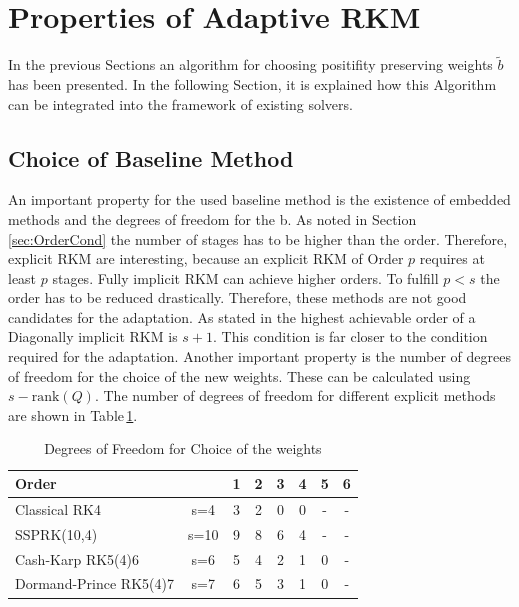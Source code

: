 \documentclass[a4paper]{article}
\numberwithin{equation}{section}
\theoremstyle{plain}
\theoremstyle{definition}
\numberwithin{theorem}{section}
\newcommand{\1}{\mathbbm{1}}
\begin{document}
\section{Properties of Adaptive RKM} \label{sec:integration}

In the previous Sections an algorithm for choosing positifity preserving weights $\tilde{b}$ has been presented. 
In the following Section, it is explained how this Algorithm can be integrated into the framework of existing solvers.

\subsection{Choice of Baseline Method}
An important property for the used baseline method is the existence of embedded methods and the degrees of freedom for the b. 
As noted in Section\,\ref{sec:OrderCond} the number of stages has to be higher than the order.  
Therefore, explicit RKM are interesting, because an explicit RKM of Order $p$ requires at least $p$ stages. 
Fully implicit RKM can achieve higher orders.  
To fulfill $p<s$ the order has to be reduced drastically. Therefore, these methods are not good candidates for the adaptation. 
As stated in \cite{norsett_attainable_1977} the highest achievable order of a Diagonally implicit RKM is $s+1$. This condition is far closer to the condition required for the adaptation. 
Another important property is the number of degrees of freedom for the choice of the new weights.  
These can be calculated using $s-\mathrm{rank}(Q)$. %
The number of degrees of freedom for different explicit methods are shown in Table\,\ref{table:DOF_exp}. 
 
\begin{table}[h!]
\centering    %
\begin{tabular}{|l c|c c c c c c |} 
 \hline 
Order & &1&2&3&4&5&6 \\ 
 \hline Classical RK4& s=4&3&2&0&0& - & -  \\ 
 SSPRK(10,4)& s=10&9&8&6&4& - & -  \\ 
 Cash-Karp RK5(4)6& s=6&5&4&2&1&0& -  \\ 
 Dormand-Prince RK5(4)7& s=7&6&5&3&1&0& -  \\ 
 \hline 
 \end{tabular}
 \caption{Degrees of Freedom for Choice of the weights} %
 \label{table:DOF_exp}
 \end{table}
 
\end{document}

